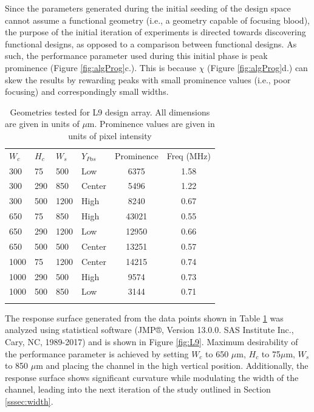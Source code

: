 Since the parameters generated during the initial seeding of the design space cannot assume a functional geometry (i.e., a geometry capable of focusing blood), the purpose of the initial iteration of experiments is directed towards discovering functional designs, as opposed to a comparison between functional designs. As such, the performance parameter used during this initial phase is peak prominence (Figure \ref{fig:algProg}c.). This is because $\chi$ (Figure \ref{fig:algProg}d.) can skew the results by rewarding peaks with small prominence values (i.e., poor focusing) and correspondingly small widths.  
\begin{table}[h]
	\caption[Geometries tested for L9 design array]{Geometries tested for L9 design array. All dimensions are given in units of $\mu$m. Prominence values are given in units of pixel intensity}
\label{tab:geometries}       %
\centering
\begin{tabular}{llll|cc}
\hline\noalign{\smallskip}
$W_c$ & $H_c$ & $W_s$ & $Y_{Pos}$ & Prominence & Freq (MHz) \\
\noalign{\smallskip}\hline\noalign{\smallskip}
300 & 75 & 500 & Low & 6375 & 1.58\\
300 & 290 & 850 & Center & 5496 & 1.22\\
300 & 500 & 1200 & High & 8240 & 0.67\\
650 & 75 & 850 & High & 43021 & 0.55\\
650 & 290 & 1200 & Low & 12950 & 0.66\\
650 & 500 & 500 & Center & 13251 & 0.57\\
1000 & 75 & 1200 & Center & 14215 & 0.74\\
1000 & 290 & 500 & High & 9574 & 0.73\\
1000 & 500 & 850 & Low & 3144 & 0.71\\
\noalign{\smallskip}\hline
\end{tabular}
\end{table}
The response surface generated from the data points shown in Table \ref{tab:geometries} was analyzed using statistical software (JMP®, Version 13.0.0. SAS Institute Inc., Cary, NC, 1989-2017) and is shown in Figure \ref{fig:L9}. Maximum desirability of the performance parameter is achieved by setting $W_c$ to 650 $\mu$m, $H_c$ to 75$\mu$m, $W_s$ to 850 $\mu$m and placing the channel in the high vertical position. Additionally, the response surface shows significant curvature while modulating the width of the channel, leading into the next iteration of the study outlined in Section \ref{sssec:width}.


